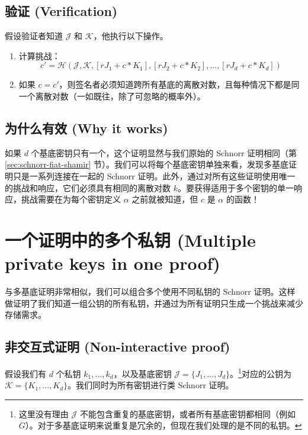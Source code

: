 \subsection*{验证 (Verification)}

假设验证者知道 $\mathcal{J}$ 和 $\mathcal{K}$，他执行以下操作。

\begin{enumerate}
	\item 计算挑战：\vspace{.175cm}
	\[c' = \mathcal{H}(\mathcal{J},\mathcal{K},[r J_1 + c*K_1],[r J_2 + c*K_2],...,[r J_d + c*K_d])\]
	\item 如果 $c = c'$，则签名者必须知道跨所有基底的离散对数，且每种情况下都是同一个离散对数（一如既往，除了可忽略的概率外）。
\end{enumerate}


\subsection*{为什么有效 (Why it works)}

如果 $d$ 个基底密钥只有一个，这个证明显然与我们原始的 Schnorr 证明相同（第 \ref{sec:schnorr-fiat-shamir} 节）。我们可以将每个基底密钥单独来看，发现多基底证明只是一系列连接在一起的 Schnorr 证明。此外，通过对所有这些证明使用唯一的挑战和响应，它们必须具有相同的离散对数 $k$。要获得适用于多个密钥的单一响应，挑战需要在为每个密钥定义 $\alpha$ 之前就被知道，但 $c$ 是 $\alpha$ 的函数！



\section{一个证明中的多个私钥 (Multiple private keys in one proof)}
\label{sec:multiple_private_keys_in_one_proof}

与多基底证明非常相似，我们可以组合多个使用不同私钥的 Schnorr 证明。这样做证明了我们知道一组公钥的所有私钥，并通过为所有证明只生成一个挑战来减少存储需求。


\subsection*{非交互式证明 (Non-interactive proof)}

假设我们有 $d$ 个私钥 $k_1,...,k_d$，以及基底密钥 $\mathcal{J} = \{J_1,...,J_d\}$。\footnote{这里没有理由 $\mathcal{J}$ 不能包含重复的基底密钥，或者所有基底密钥都相同（例如 $G$）。对于多基底证明来说重复是冗余的，但现在我们处理的是不同的私钥。}对应的公钥为 $\mathcal{K} = \{K_1,...,K_d\}$。我们同时为所有密钥进行类 Schnorr 证明。

